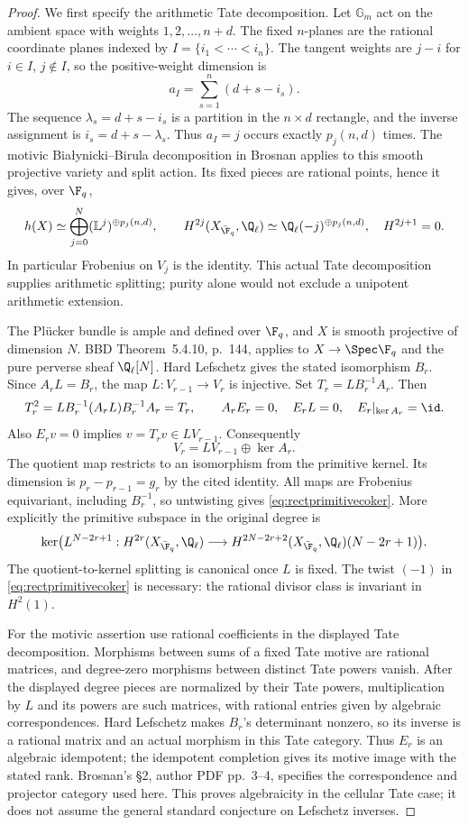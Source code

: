 \begin{proof}
We first specify the arithmetic Tate decomposition. Let $\mathbb G_m$
act on the ambient space with weights $1,2,\ldots,n+d$.
The fixed $n$-planes are the rational coordinate planes indexed by
$I=\{i_1<\cdots<i_n\}$. The tangent weights are $j-i$ for
$i\in I$, $j\notin I$, so the positive-weight dimension is
\[
 a_I=\sum_{s=1}^n(d+s-i_s).
\]
The sequence $\lambda_s=d+s-i_s$ is a partition in the
$n\times d$ rectangle, and the inverse assignment is
$i_s=d+s-\lambda_s$. Thus $a_I=j$ occurs exactly $p_j(n,d)$
times. The motivic Bia\l ynicki--Birula decomposition in
Brosnan \cite[Theorems~3.3 and~3.5, author PDF pp.~5--6]{Brosnan}
applies to this smooth projective variety and split action.
Its fixed pieces are rational points, hence it gives, over $\F_q$,
\[
 h(X)\simeq\bigoplus_{j=0}^{N}(\mathbb L^j)^{\oplus p_j(n,d)},
 \qquad
 H^{2j}(X_{\bar{\F}_q},\Q_\ell)
    \simeq\Q_\ell(-j)^{\oplus p_j(n,d)},\quad H^{2j+1}=0.
\]
In particular Frobenius on $V_j$ is the identity. This actual
Tate decomposition supplies arithmetic splitting; purity alone
would not exclude a unipotent arithmetic extension.

The Pl\"ucker bundle is ample and defined over $\F_q$, and
$X$ is smooth projective of dimension $N$. BBD Theorem~5.4.10,
p.~144, applies to $X\to\Spec\F_q$ and the pure perverse
sheaf $\Q_\ell[N]$. Hard Lefschetz gives the stated isomorphism
$B_r$. Since $A_rL=B_r$, the map $L:V_{r-1}\to V_r$ is injective.
Set $T_r=L B_r^{-1}A_r$. Then
\[
 T_r^2=L B_r^{-1}(A_rL)B_r^{-1}A_r=T_r,\qquad
 A_r E_r=0,\quad E_r L=0,\quad
 E_r|_{\ker A_r}=\id.
\]
Also $E_rv=0$ implies $v=T_rv\in L V_{r-1}$.
Consequently
\[
 V_r=L V_{r-1}\oplus\ker A_r.
\]
The quotient map restricts to an isomorphism from the primitive
kernel. Its dimension is $p_r-p_{r-1}=g_r$ by the cited identity.
All maps are Frobenius equivariant, including $B_r^{-1}$, so
untwisting gives \eqref{eq:rectprimitivecoker}. More explicitly
the primitive subspace in the original degree is
\[
 \ker\bigl(L^{N-2r+1}:H^{2r}(X_{\bar{\F}_q},\Q_\ell)
 \longrightarrow
 H^{2N-2r+2}(X_{\bar{\F}_q},\Q_\ell)(N-2r+1)\bigr).
\]
The quotient-to-kernel splitting is canonical once $L$ is fixed.
The twist $(-1)$ in \eqref{eq:rectprimitivecoker} is necessary:
the rational divisor class is invariant in $H^2(1)$.

For the motivic assertion use rational coefficients in the displayed
Tate decomposition. Morphisms between sums of a fixed Tate motive
are rational matrices, and degree-zero morphisms between distinct
Tate powers vanish. After the displayed degree pieces are normalized
by their Tate powers, multiplication by $L$ and its powers are such
matrices, with rational entries given by algebraic correspondences.
Hard Lefschetz makes $B_r$'s determinant nonzero, so its inverse
is a rational matrix and an actual morphism in this Tate category.
Thus $E_r$ is an algebraic idempotent; the idempotent completion
gives its motive image with the stated rank. Brosnan's \S2,
author PDF pp.~3--4, specifies the correspondence and projector
category used here. This proves algebraicity in the cellular Tate
case; it does not assume the general standard conjecture on
Lefschetz inverses.


\end{proof}
